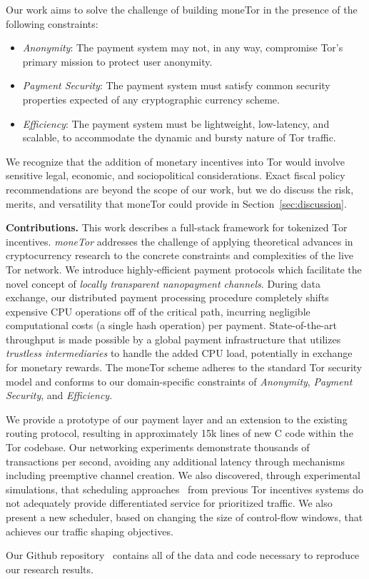 Our work aims to solve the challenge of building moneTor in the presence of the following constraints:

\begin{itemize}

\item \emph{Anonymity}: The payment system may not, in any way, compromise Tor's primary mission to protect user anonymity.

\item \emph{Payment Security}: The payment system must satisfy common security properties expected of any cryptographic currency scheme.

\item \emph{Efficiency}: The payment system must be lightweight, low-latency, and scalable, to accommodate the
dynamic and bursty nature of Tor traffic.


\end{itemize}

We recognize that the addition of monetary incentives into Tor would involve sensitive legal, economic, and sociopolitical considerations.
Exact fiscal policy recommendations are beyond the scope of our work, but we do discuss the risk, merits, and versatility that moneTor could provide in Section~\ref{sec:discussion}.

\label{sec:Contributions} \medskip \noindent \textbf{Contributions.}
This work describes a full-stack framework for tokenized Tor incentives.
\emph{moneTor} addresses the challenge of applying theoretical advances in cryptocurrency research to the concrete constraints and complexities of the live Tor network.
We introduce highly-efficient payment protocols which facilitate the novel concept of \emph{locally transparent nanopayment channels}.
During data exchange, our distributed payment processing procedure completely shifts expensive CPU operations off of the critical path, incurring negligible computational costs (a single hash operation) per payment.
State-of-the-art throughput is made possible by a global payment infrastructure that utilizes \emph{trustless intermediaries} to handle the added CPU load, potentially in exchange for monetary rewards.
The moneTor scheme adheres to the standard Tor security model and conforms to our domain-specific constraints of \emph{Anonymity}, \emph{Payment Security}, and \emph{Efficiency}.

We provide a prototype of our payment layer and an extension to the existing routing protocol, resulting in approximately 15k lines of new C code within the Tor codebase.
Our networking experiments demonstrate thousands of transactions per second, avoiding any additional latency through mechanisms including preemptive channel creation.
We also discovered, through experimental simulations, that scheduling approaches~\cite{dovrolis1999case, tang2010improved} from previous Tor incentives systems do not adequately provide differentiated service for prioritized traffic.
We also present a new scheduler, based on changing the size of control-flow windows, that achieves our traffic shaping objectives.

Our Github repository~\cite{monetor-github} contains all of the data and code necessary to reproduce our research results.

